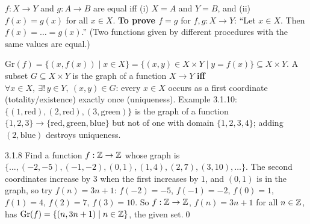 \begin{result}
$f:X\to Y$ and $g:A\to B$ are equal iff (i) $X=A$ and $Y=B$, and (ii) $f(x)=g(x)$ for all $x\in X$. \textbf{To prove $f=g$} for $f,g:X\to Y$: ``Let $x\in X$. Then $f(x)=\dots=g(x)$.'' (Two functions given by different procedures with the same values are equal.)
\end{result}
\begin{key}
$\mathrm{Gr}(f)=\{(x,f(x))\mid x\in X\}=\{(x,y)\in X\times Y\mid y=f(x)\}\subseteq X\times Y$. A subset $G\subseteq X\times Y$ is the graph of a function $X\to Y$ \textbf{iff} $\forall x\in X,\ \exists!\,y\in Y,\ (x,y)\in G$: every $x\in X$ occurs as a first coordinate (totality/existence) exactly once (uniqueness). Example 3.1.10: $\{(1,\mathrm{red}),(2,\mathrm{red}),(3,\mathrm{green})\}$ is the graph of a function $\{1,2,3\}\to\{\mathrm{red},\mathrm{green},\mathrm{blue}\}$ but not of one with domain $\{1,2,3,4\}$; adding $(2,\mathrm{blue})$ destroys uniqueness.
\end{key}

\begin{bookex}[recommended]{3.1.8}
Find a function $f:\mathbb{Z}\to\mathbb{Z}$ whose graph is $\{\dots,(-2,-5),(-1,-2),(0,1),(1,4),(2,7),(3,10),\dots\}$.
\solution
The second coordinates increase by $3$ when the first increases by $1$, and $(0,1)$ is in the graph, so try $f(n)=3n+1$: $f(-2)=-5$, $f(-1)=-2$, $f(0)=1$, $f(1)=4$, $f(2)=7$, $f(3)=10$. So $f:\mathbb{Z}\to\mathbb{Z}$, $f(n)=3n+1$ for all $n\in\mathbb{Z}$, has $\mathrm{Gr}(f)=\{(n,3n+1)\mid n\in\mathbb{Z}\}$, the given set.\qed
\end{bookex}

